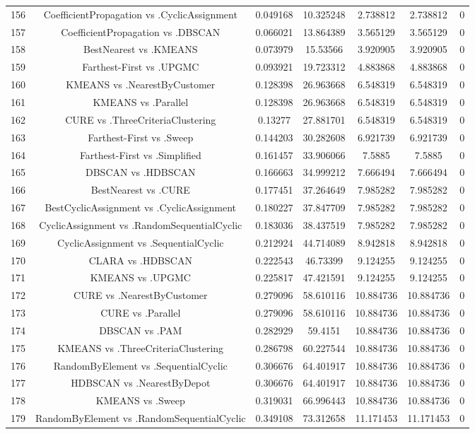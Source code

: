 \documentclass[a4paper,10pt]{article}
\begin{document}
\begin{landscape}
\begin{table}[!htp]
\begin{tabular}{ccccccc}
156&CoefficientPropagation vs .CyclicAssignment&0.049168&10.325248&2.738812&2.738812&0\\
157&CoefficientPropagation vs .DBSCAN&0.066021&13.864389&3.565129&3.565129&0\\
158&BestNearest vs .KMEANS&0.073979&15.53566&3.920905&3.920905&0\\
159&Farthest-First vs .UPGMC&0.093921&19.723312&4.883868&4.883868&0\\
160&KMEANS vs .NearestByCustomer&0.128398&26.963668&6.548319&6.548319&0\\
161&KMEANS vs .Parallel&0.128398&26.963668&6.548319&6.548319&0\\
162&CURE vs .ThreeCriteriaClustering&0.13277&27.881701&6.548319&6.548319&0\\
163&Farthest-First vs .Sweep&0.144203&30.282608&6.921739&6.921739&0\\
164&Farthest-First vs .Simplified&0.161457&33.906066&7.5885&7.5885&0\\
165&DBSCAN vs .HDBSCAN&0.166663&34.999212&7.666494&7.666494&0\\
166&BestNearest vs .CURE&0.177451&37.264649&7.985282&7.985282&0\\
167&BestCyclicAssignment vs .CyclicAssignment&0.180227&37.847709&7.985282&7.985282&0\\
168&CyclicAssignment vs .RandomSequentialCyclic&0.183036&38.437519&7.985282&7.985282&0\\
169&CyclicAssignment vs .SequentialCyclic&0.212924&44.714089&8.942818&8.942818&0\\
170&CLARA vs .HDBSCAN&0.222543&46.73399&9.124255&9.124255&0\\
171&KMEANS vs .UPGMC&0.225817&47.421591&9.124255&9.124255&0\\
172&CURE vs .NearestByCustomer&0.279096&58.610116&10.884736&10.884736&0\\
173&CURE vs .Parallel&0.279096&58.610116&10.884736&10.884736&0\\
174&DBSCAN vs .PAM&0.282929&59.4151&10.884736&10.884736&0\\
175&KMEANS vs .ThreeCriteriaClustering&0.286798&60.227544&10.884736&10.884736&0\\
176&RandomByElement vs .SequentialCyclic&0.306676&64.401917&10.884736&10.884736&0\\
177&HDBSCAN vs .NearestByDepot&0.306676&64.401917&10.884736&10.884736&0\\
178&KMEANS vs .Sweep&0.319031&66.996443&10.884736&10.884736&0\\
179&RandomByElement vs .RandomSequentialCyclic&0.349108&73.312658&11.171453&11.171453&0\\

\end{tabular}
\end{table}
\end{landscape}
\end{document}
